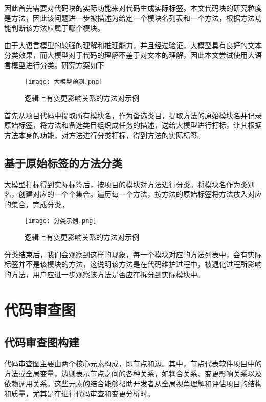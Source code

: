 因此首先需要对代码块的实际功能来对代码生成实际标签。本文代码块的研究粒度是方法，因此该问题进一步被描述为给定一个模块名列表和一个方法，根据方法功能判断该方法应属于哪个模块。

由于大语言模型的较强的理解和推理能力，并且经过验证，大模型具有良好的文本分类效果\cite{wan-etal-2023-gpt}，而大模型对于代码的理解不差于对文本的理解，因此本文尝试使用大语言模型进行分类。研究方案如下

\begin{figure}[h]
\centering
\texttt{[image: 大模型预测.png]}
\caption{逻辑上有变更影响关系的方法对示例}
\end{figure}

首先从项目代码中提取所有模块名，作为备选类目，提取方法的原始模块名并记录原始标签，将方法和备选类目组织成任务的描述，送给大模型进行打标，让其根据方法本身的功能，对方法进行分类打标，得到方法的实际标签。


\subsection{基于原始标签的方法分类}

大模型打标得到实际标签后，按项目的模块对方法进行分类。将模块名作为类别名，创建对应的一个个集合。遍历每一个方法，按方法的原始标签将方法放入对应的集合，完成分类。

\begin{figure}[h]
\centering
\texttt{[image: 分类示例.png]}
\caption{逻辑上有变更影响关系的方法对示例}
\end{figure}

分类结束后，我们会观察到这样的现象，每一个模块对应的方法列表中，会有实际标签并不是该模块的方法，这说明该方法是在代码维护过程中，被退化过程所影响的方法，用户应进一步观察该方法是否应在拆分到实际模块中。


\section{代码审查图}

\subsection{代码审查图构建}

代码审查图主要由两个核心元素构成，即节点和边。其中，节点代表软件项目中的方法或全局变量，边则表示节点之间的各种关系，如耦合关系、变更影响关系以及依赖调用关系。这些元素的结合能够帮助开发者从全局视角理解和评估项目的结构和质量，尤其是在进行代码审查和变更分析时。

